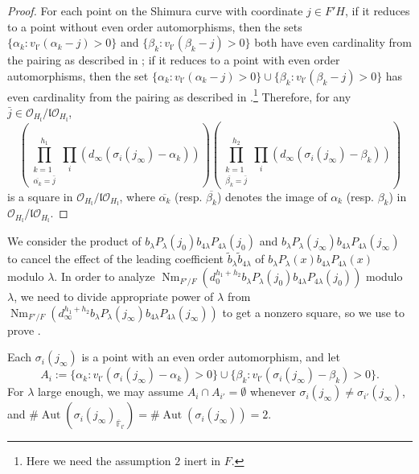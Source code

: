 \documentclass{amsart}
\numberwithin{equation}{subsection}
\numberwithin{theorem}{section}
\theoremstyle{definition}
\theoremstyle{remark}
\newcommand{\bF}{\mathbb{F}}
\newcommand{\cO}{\mathcal{O}}
\DeclareMathOperator{\Nm}{Nm}
\DeclareMathOperator{\Aut}{Aut}
\begin{document}
\begin{proof}
For each point on the Shimura curve with coordinate $j \in F'H$, if it reduces to a point without even order automorphisms, then the sets $\{\alpha_k: v_{\mathfrak{l}'}(\alpha_k-j) >0 \}$ and $\{\beta_k: v_{\mathfrak{l}'}(\beta_k-j) > 0 \}$ both have even cardinality from the pairing as described in ;  if it reduces to a point with even order automorphisms, then the set $\{\alpha_k: v_{\mathfrak{l}'}(\alpha_k-j) >0 \}\cup \{\beta_k: v_{\mathfrak{l}'}(\beta_k-j) > 0 \}$ has even cardinality from the pairing as described in .\footnote{Here we need the assumption $2$ inert in $F$.}
Therefore, for any $\bar{j} \in \cO_{H_{\mathfrak{l}}} / \mathfrak{l}\cO_{H_{\mathfrak{l}}}$, \begin{equation}\label{eq:square}\left(\prod^{h_1}_{\substack{k=1\\ \overline{\alpha_k} = \bar{j}}} \prod_i(d_{\infty} (\sigma_i(j_{\infty}) - \alpha_k))\right)\left(\prod^{h_2}_{\substack{k=1\\ \overline{\beta_k} = \bar{j}}} \prod_i(d_{\infty} (\sigma_i(j_{\infty}) - \beta_k))\right)\end{equation} is a square in $\cO_{H_{\mathfrak{l}}}/\mathfrak{l}\cO_{H_{\mathfrak{l}}}$, where $\overline{\alpha_k}$ (resp. $\overline{\beta_k}$) denotes the image of $\alpha_k$ (resp. $\beta_k$) in $\cO_{H_{\mathfrak{l}}} / \mathfrak{l}\cO_{H_{\mathfrak{l}}}$. 
\end{proof}

We consider the product of $b_{\lambda}P_{\lambda}(j_0)b_{4\lambda}P_{4\lambda}(j_0)$ and $b_{\lambda}P_{\lambda}(j_\infty)b_{4\lambda}P_{4\lambda}(j_\infty)$ to cancel the effect of the leading coefficient $\tilde{b}_\lambda \tilde{b}_{4\lambda}$ of $b_{\lambda}P_{\lambda}(x) b_{4\lambda} P_{4\lambda}(x)$ modulo $\lambda$. In order to analyze $\Nm_{F'/F}(d_0^{h_1+h_2}b_{\lambda}P_{\lambda}(j_0)b_{4\lambda}P_{4\lambda}(j_0))$ modulo $\lambda$, we need to divide appropriate power of $\lambda$ from $\Nm_{F'/F}(d_{\infty}^{h_1+h_2} b_{\lambda} P_{\lambda}(j_{\infty}) b_{4\lambda} P_{4\lambda}(j_{\infty}))$ to get a nonzero square, so we use  to prove .

Each $\sigma_i(j_{\infty})$ is a point with an even order automorphism, and let \[A_i := \{\alpha_k: v_{\mathfrak{l}'}(\sigma_i(j_{\infty}) - \alpha_k) > 0\} \cup \{\beta_k: v_{\mathfrak{l}'}(\sigma_i(j_{\infty}) - \beta_k) > 0\}.\] For $\lambda$ large enough, we may assume $A_{i} \cap A_{i'} = \emptyset$ whenever $\sigma_i(j_{\infty}) \neq \sigma_{i'}(j_{\infty})$, and $\#\Aut(\sigma_i(j_{\infty})_{\overline{\bF}_{\mathfrak{l}'}}) =\#\Aut(\sigma_i(j_{\infty})) = 2$.
\end{document}
